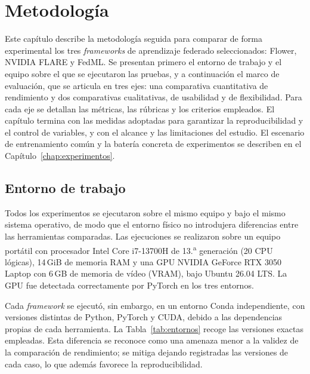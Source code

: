 \chapter{Metodología}\label{chap:metodologia}

\providecommand{\FloatBarrier}{\clearpage}

Este capítulo describe la metodología seguida para comparar de forma experimental los tres
\textit{frameworks} de aprendizaje federado seleccionados: Flower, NVIDIA FLARE y FedML. Se
presentan primero el entorno de trabajo y el equipo sobre el que se ejecutaron las pruebas, y a
continuación el marco de evaluación, que se articula en tres ejes: una comparativa cuantitativa
de rendimiento y dos comparativas cualitativas, de usabilidad y de flexibilidad. Para cada eje se
detallan las métricas, las rúbricas y los criterios empleados. El capítulo termina con las
medidas adoptadas para garantizar la reproducibilidad y el control de variables, y con el alcance
y las limitaciones del estudio. El escenario de entrenamiento común y la batería concreta de
experimentos se describen en el Capítulo~\ref{chap:experimentos}.

\section{Entorno de trabajo}\label{sec:entorno-trabajo}

Todos los experimentos se ejecutaron sobre el mismo equipo y bajo el mismo sistema operativo, de
modo que el entorno físico no introdujera diferencias entre las herramientas comparadas. Las
ejecuciones se realizaron sobre un equipo portátil con procesador Intel Core i7-13700H de 13.\textsuperscript{a}
generación (20 CPU lógicas), 14\,GiB de memoria RAM y una GPU NVIDIA GeForce RTX 3050 Laptop con
6\,GB de memoria de vídeo (VRAM), bajo Ubuntu 26.04 LTS. La GPU fue detectada correctamente por
PyTorch en los tres entornos.

Cada \textit{framework} se ejecutó, sin embargo, en un entorno Conda independiente, con versiones
distintas de Python, PyTorch y CUDA, debido a las dependencias propias de cada herramienta. La
Tabla~\ref{tab:entornos} recoge las versiones exactas empleadas. Esta diferencia se reconoce como
una amenaza menor a la validez de la comparación de rendimiento; se mitiga dejando registradas las
versiones de cada caso, lo que además favorece la reproducibilidad.

